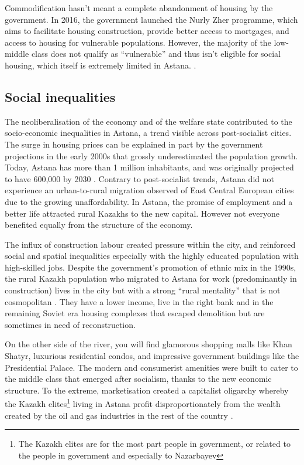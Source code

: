 \documentclass{article}
\begin{document}
Commodification hasn't meant a complete abandonment of housing by the government. In 2016, the government launched the Nurly Zher programme, which aims to facilitate housing construction, provide better access to mortgages, and access to housing for vulnerable populations. However, the majority of the low-middle class does not qualify as ``vulnerable'' and thus isn't eligible for social housing, which itself is extremely limited in Astana. \parencite{unece2018housing}.

\subsection{Social inequalities}

The neoliberalisation of the economy and of the welfare state contributed to the socio-economic inequalities in Astana, a trend visible across post-socialist cities. The surge in housing prices can be explained in part by the government projections in the early 2000s that grossly underestimated the population growth. Today, Astana has more than 1 million inhabitants, and was originally projected to have 600,000 by 2030 \parencite{masterplan2001}. Contrary to post-socialist trends, Astana did not experience an urban-to-rural migration observed of East Central European cities due to the growing unaffordability. In Astana, the promise of employment and a better life attracted rural Kazakhs to the new capital. However not everyone benefited equally from the structure of the economy.

The influx of construction labour created pressure within the city, and reinforced social and spatial inequalities especially with the highly educated population with high-skilled jobs.
Despite the government's promotion of ethnic mix in the 1990s, the rural Kazakh population who migrated to Astana for work (predominantly in construction) lives in the city but with a strong ``rural mentality'' that is not cosmopolitan \parencite{koch2014bordering}. They have a lower income, live in the right bank and in the remaining Soviet era housing complexes that escaped demolition but are sometimes in need of reconstruction.

On the other side of the river,  you will find glamorous shopping malls like Khan Shatyr, luxurious residential condos, and impressive government buildings like the Presidential Palace. The modern and consumerist amenities were built to cater to the middle class that emerged after socialism, thanks to the new economic structure. To the extreme, marketisation created a capitalist oligarchy whereby the Kazakh elites\footnote{The Kazakh elites are for the most part people in government, or related to the people in government and especially to Nazarbayev} living in Astana profit disproportionately from the wealth created by the oil and gas industries in the rest of the country \parencite{gallo2021three}.
\end{document}

